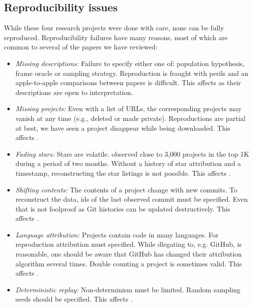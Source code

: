 \documentclass[sigconf,review,anonymous]{acmart}
\newcommand{\gh}{{GitHub}\xspace}
\begin{document}
\newpage
\subsection{Reproducibility issues}

While these four research projects were done with care, none can be fully reproduced.
Reproducibility failures have many reasons, most of which are common to several
of the papers we have reviewed:
\begin{itemize}[leftmargin=*]
\item {\it Missing descriptions:} Failure to specify either one of: population
  hypothesis, frame oracle or sampling strategy. Reproduction is fraught with
  perils and an apple-to-apple comparisons between papers is difficult. This
  affects
  \cite{Pfeiffer20,nakamaru:2020:MSR,Markovtsev:2019:MSR,Jebnoun:2020:MSR} as
  their descriptions are open to interpretation.
\item {\it Missing projects:} Even with a list of URLs, the corresponding
  projects may vanish at any time (e.g., deleted or made private). Reproductions
  are partial at best, we have seen a project disappear while being
  downloaded. This affects
  \cite{Pfeiffer20,nakamaru:2020:MSR,Markovtsev:2019:MSR,Jebnoun:2020:MSR}.
\item {\it Fading stars:} Stars are volatile. \citet{nakamaru:2020:MSR} observed
  close to 3,000 projects in the top 1K during a period of two months. Without a
  history of star attribution and a timestamp, reconstructing the star
  listings is not possible. This affects \cite{Jebnoun:2020:MSR}.
\item {\it Shifting contents:} The contents of a project change with new
  commits. To reconstruct the data, ids of the last observed commit must be
  specified. Even that is not foolproof as Git histories can be updated
  destructively. This affects
  \cite{Pfeiffer20,nakamaru:2020:MSR,Jebnoun:2020:MSR}.
\item {\it Language attribution:} Projects contain code in many languages. For
  reproduction attribution must specified. While dlegating to, e.g. \gh, is
  reasonable, one should be aware that \gh has changed their attribution
  algorithm several times. Double counting a project is sometimes valid. This
  affects \cite{Pfeiffer20, nakamaru:2020:MSR,Markovtsev:2019:MSR}.
\item {\it Deterministic replay:} Non-determinism must be limited. Random
  sampling seeds should be specified. This affects
  \cite{Markovtsev:2019:MSR}.
\end{itemize}
\end{document}
